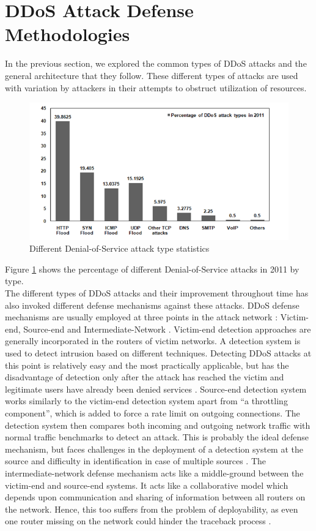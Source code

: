 \section{DDoS Attack Defense Methodologies}
In the previous section, we explored the common types of DDoS attacks and the general architecture that they follow. These different types of attacks are used with variation by attackers in their attempts to obstruct utilization of resources.  
\begin{figure}
	\includegraphics[width=1.0\columnwidth]{images/dosattackstat.PNG}
	\caption{Different Denial-of-Service attack type statistics \cite{monowar01}}
	\label{F:dosstat}
\end{figure}
Figure \ref{F:dosstat} shows the percentage of different Denial-of-Service attacks in 2011 by type.\\
The different types of DDoS attacks and their improvement throughout time has also invoked different defense mechanisms against these attacks. DDoS defense mechanisms are usually employed at three points in the attack network : Victim-end, Source-end and Intermediate-Network \cite{monowar01}. Victim-end detection approaches are generally incorporated in the routers of victim networks. A detection system is used to detect intrusion based on different techniques.  Detecting DDoS attacks at this point is relatively easy and the most practically applicable, but has the disadvantage of detection only after the attack has reached the victim and legitimate users have already been denied services \cite{monowar01}. Source-end detection system works similarly to the victim-end detection system apart from ``a throttling component'', which is added to force a rate limit on outgoing connections. The detection system then compares both incoming and outgoing network traffic with normal traffic benchmarks to detect an attack. This is probably the ideal defense mechanism, but faces challenges in the deployment of a detection system at the source and difficulty in identification in case of multiple sources \cite{monowar01}. The intermediate-network defense mechanism acts like a middle-ground between the victim-end and source-end systems. It acts like a collaborative model which depends upon communication and sharing of information between all routers on the network. Hence, this too suffers from the problem of deployability, as even one router missing on the network could hinder the traceback process \cite{monowar01}.\\
